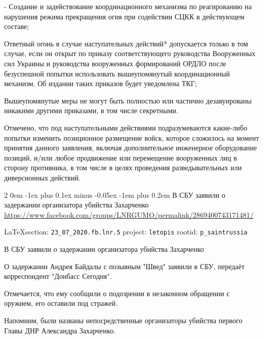 \documentclass[a4paper,11pt]{extreport}
\makeatletter
\renewcommand\subsection{%
  \clearpage
    \@startsection{subsection}%
    {2}%
    {0em}%
    {-1ex plus 0.1ex minus -0.05ex}%
    {-1em plus 0.2em}%
    {\scshape\bfseries\Large}%
}
\makeatother
\begin{document}
- Создание и задействование координационного механизма по реагированию на
нарушения режима прекращения огня при содействии СЦКК в действующем составе;

Ответный огонь в случае наступательных действий* допускается только в том
случае, если он открыт по приказу соответствующего руководства Вооруженных сил
Украины и руководства вооруженных формирований ОРДЛО после безуспешной попытки
использовать вышеупомянутый координационный механизм. Об издании таких приказов
будет уведомлена ТКГ;

Вышеупомянутые меры не могут быть полностью или частично дезавуированы никакими
другими приказами, в том числе секретными.

Отмечено, что под наступательными действиями подразумеваются какие-либо попытки
изменить позиционное размещение войск, которое сложилось на момент принятия
данного заявления, включая дополнительное инженерное оборудование позиций,
и/или любое продвижение или перемещение вооруженных лиц в сторону противника, в
том числе в целях проведения разведывательных или диверсионных действий.

 
 
\subsection{В СБУ заявили о задержании организатора убийства Захарченко}
\label{sec:23_07_2020.fb.lnr.5}
\url{https://www.facebook.com/groups/LNRGUMO/permalink/2869400743171481/}

  
\vspace{0.5cm}
{\small\LaTeX section: \verb|23_07_2020.fb.lnr.5| project: \verb|letopis| rootid: \verb|p_saintrussia|}
\vspace{0.5cm}
 
В СБУ заявили о задержании организатора убийства Захарченко

О задержании Андрея Байдалы с позывным "Швед" заявили в СБУ, передаёт
корреспондент "Донбасс Сегодня".

Отмечается, что ему сообщили о подозрении в незаконном обращении с оружием, его
оставили под стражей.

Напомним, были названы непосредственные организаторы убийства первого Главы ДНР
Александра Захарченко.
\end{document}
